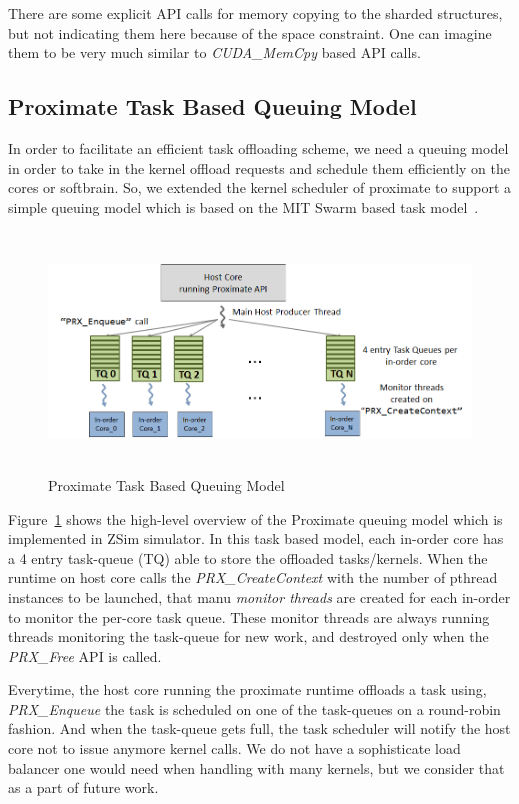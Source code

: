 There are some explicit API calls for memory copying to the sharded structures,
but not indicating them here because of the space constraint. One can imagine them
to be very much similar to \emph{CUDA\_MemCpy} based API calls. 


\subsection{Proximate Task Based Queuing Model}\label{sec:queue}

In order to facilitate an efficient task offloading scheme, 
we need a queuing model in order to take in the kernel offload requests 
and schedule them efficiently on the cores or softbrain.
So, we extended the kernel scheduler of proximate to support a simple
queuing model which is based on the MIT Swarm based task model~\cite{jeffrey2016unlocking, jeffreyswarm}.

\begin{figure}[h]
  \begin{center}
    \includegraphics[width=0.9\linewidth, height=2.5in]{cs758-figs/q-model.png}
  \end{center}
\vspace{-0.2in}
  \caption{Proximate Task Based Queuing Model}
  \label{fig:q-model}
\vspace{-0.05in}
\end{figure}

Figure~\ref{fig:q-model} shows the high-level overview of the
Proximate queuing model which is implemented in ZSim simulator.
In this task based model, each in-order core has a 4 entry task-queue (TQ)
able to store the offloaded tasks/kernels. When the runtime on host core
calls the \emph{PRX\_CreateContext} with the number of pthread instances to be launched, 
that manu \emph{monitor threads} are created for each in-order to monitor the per-core
task queue. These monitor threads are always running threads monitoring the task-queue for new work, 
and destroyed only when the \emph{PRX\_Free} API is called.

Everytime, the host core running the proximate runtime offloads a task
using, \emph{PRX\_Enqueue} the task is scheduled on one of the task-queues on a round-robin fashion.
And when the task-queue gets full, the task scheduler will notify the host core not to issue anymore
kernel calls. We do not have a sophisticate load balancer one would need when handling with many kernels, 
but we consider that as a part of future work. 

